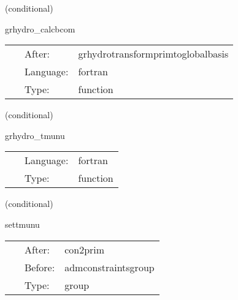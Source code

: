 \vspace{5mm}

   (conditional) 

\hspace{5mm} grhydro\_calcbcom 

\hspace{5mm}{\it compute comoving magnetic field, pressure, etc... } 


\hspace{5mm}

 \begin{tabular*}{160mm}{cll} 
~ & After:  & grhydrotransformprimtoglobalbasis \\ 
~ & Language:  & fortran \\ 
~ & Type:  & function \\ 
\end{tabular*} 


\vspace{5mm}

   (conditional) 

\hspace{5mm} grhydro\_tmunu 

\hspace{5mm}{\it compute the energy-momentum tensor } 


\hspace{5mm}

 \begin{tabular*}{160mm}{cll} 
~ & Language:  & fortran \\ 
~ & Type:  & function \\ 
\end{tabular*} 


\vspace{5mm}

   (conditional) 

\hspace{5mm} settmunu 

\hspace{5mm}{\it calculate the stress-energy tensor } 


\hspace{5mm}

 \begin{tabular*}{160mm}{cll} 
~ & After:  & con2prim \\ 
~ & Before:  & admconstraintsgroup \\ 
~ & Type:  & group \\ 
\end{tabular*} 


